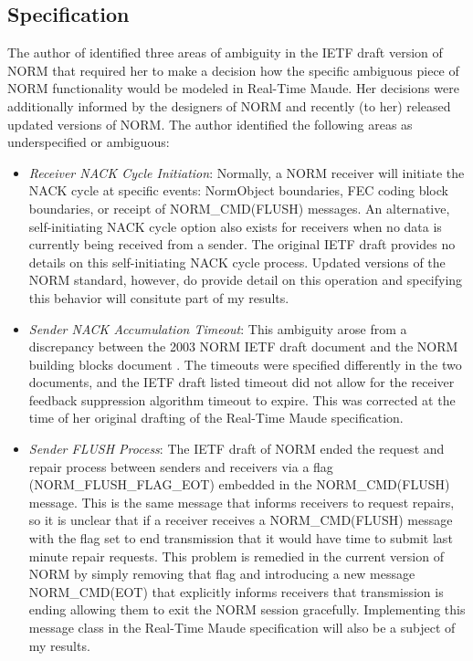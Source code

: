 \documentclass[10pt, journal]{IEEEtran}
\begin{document}
\subsection{Specification}
The author of \cite{Lien2004} identified three areas of ambiguity in the IETF draft version of NORM that required her to make a decision how the specific ambiguous piece of NORM functionality would be modeled in Real-Time Maude. Her decisions were additionally informed by the designers of NORM and recently (to her) released updated versions of NORM. The author identified the following areas as underspecified or ambiguous:
\begin{itemize}
	\item \textit{Receiver NACK Cycle Initiation}: Normally, a NORM receiver will initiate the NACK cycle at specific events: NormObject boundaries, FEC coding block boundaries, or receipt of NORM\_CMD(FLUSH) messages. An alternative, self-initiating NACK cycle option also exists for receivers when no data is currently being received from a sender. The original IETF draft provides no details on this self-initiating NACK cycle process. Updated versions of the NORM standard, however, do provide detail on this operation and specifying this behavior will consitute part of my results.
	\item \textit{Sender NACK Accumulation Timeout}: This ambiguity arose from a discrepancy between the 2003 NORM IETF draft document and the NORM building blocks document \cite{rfc5401}. The timeouts were specified differently in the two documents, and the IETF draft listed timeout did not allow for the receiver feedback suppression algorithm timeout to expire. This was corrected at the time of her original drafting of the Real-Time Maude specification.
	\item \textit{Sender FLUSH Process}: The IETF draft of NORM ended the request and repair process between senders and receivers via a flag (NORM\_FLUSH\_FLAG\_EOT) embedded in the NORM\_CMD(FLUSH) message. This is the same message that informs receivers to request repairs, so it is unclear that if a receiver receives a NORM\_CMD(FLUSH) message with the flag set to end transmission that it would have time to submit last minute repair requests. This problem is remedied in the current version of NORM by simply removing that flag and introducing a new message NORM\_CMD(EOT) that explicitly informs receivers that transmission is ending allowing them to exit the NORM session gracefully. Implementing this message class in the Real-Time Maude specification will also be a subject of my results.
\end{itemize}
\end{document}
